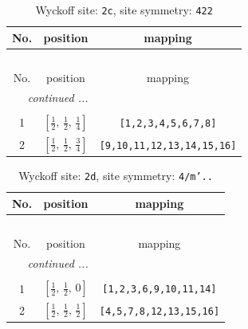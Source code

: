 \documentclass[fleqn,8pt]{jsarticle}
\begin{document}
\renewcommand{\arraystretch}{1.2}
\begin{longtable}{ccc}
\caption{Wyckoff site: {\tt 2c}, site symmetry: {\tt 422}}
 \\
 \hline \hline
No. & position & mapping \\ \hline \endfirsthead

\multicolumn{2}{l}{\tablename\ \thetable{}} \\
 \hline \hline
No. & position & mapping \\ \hline \endhead

 \hline \hline
\multicolumn{2}{r}{\footnotesize\it continued ...} \\ \endfoot

 \hline \hline
\multicolumn{2}{r}{} \\ \endlastfoot

1 & $\left[ \frac{1}{2},\, \frac{1}{2},\, \frac{1}{4} \right]$ & {\tt [1,2,3,4,5,6,7,8]} \\ \hline
2 & $\left[ \frac{1}{2},\, \frac{1}{2},\, \frac{3}{4} \right]$ & {\tt [9,10,11,12,13,14,15,16]} \\
\end{longtable}
\renewcommand{\arraystretch}{1.2}
\begin{longtable}{ccc}
\caption{Wyckoff site: {\tt 2d}, site symmetry: {\tt 4/m'..}}
 \\
 \hline \hline
No. & position & mapping \\ \hline \endfirsthead

\multicolumn{2}{l}{\tablename\ \thetable{}} \\
 \hline \hline
No. & position & mapping \\ \hline \endhead

 \hline \hline
\multicolumn{2}{r}{\footnotesize\it continued ...} \\ \endfoot

 \hline \hline
\multicolumn{2}{r}{} \\ \endlastfoot

1 & $\left[ \frac{1}{2},\, \frac{1}{2},\, 0 \right]$ & {\tt [1,2,3,6,9,10,11,14]} \\ \hline
2 & $\left[ \frac{1}{2},\, \frac{1}{2},\, \frac{1}{2} \right]$ & {\tt [4,5,7,8,12,13,15,16]} \\
\end{longtable}
\renewcommand{\arraystretch}{1.2}
\end{document}
